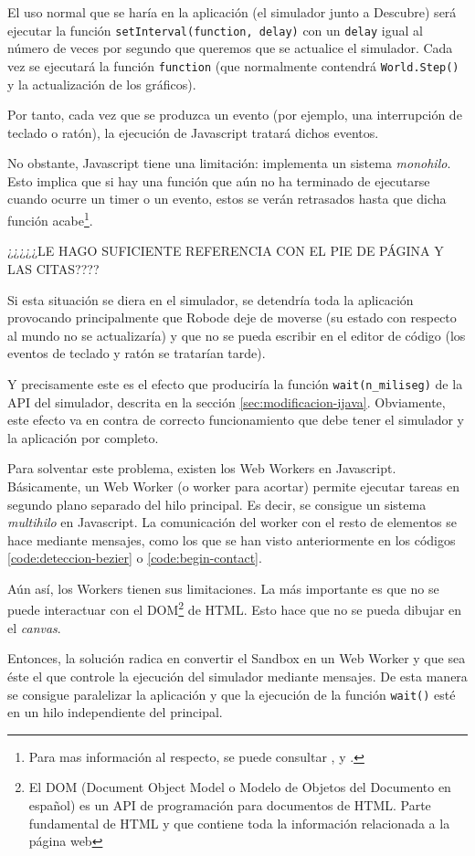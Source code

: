 El uso normal que se haría en la aplicación (el simulador junto a Descubre) será ejecutar la función \texttt{setInterval(function, delay)} con un \texttt{delay} igual al número de veces por segundo que queremos que se actualice el simulador. Cada vez se ejecutará la función \texttt{function} (que normalmente contendrá \texttt{World.Step()} y la actualización de los gráficos).

Por tanto, cada vez que se produzca un evento (por ejemplo, una interrupción de teclado o ratón), la ejecución de Javascript tratará dichos eventos. 

No obstante, Javascript tiene una limitación: implementa un sistema \emph{monohilo}. Esto implica que si hay una función que aún no ha terminado de ejecutarse cuando ocurre un timer o un evento, estos se verán retrasados hasta que dicha función acabe\footnote{Para mas información al respecto, se puede consultar \cite{js-timers-works}, \cite{event-loop-js} y \cite{resig2013secrets}.}.

{\color{red} ¿¿¿¿¿LE HAGO SUFICIENTE REFERENCIA CON EL PIE DE PÁGINA Y LAS CITAS????}

Si esta situación se diera en el simulador, se detendría toda la aplicación provocando principalmente que Robode deje de moverse (su estado con respecto al mundo no se actualizaría) y que no se pueda escribir en el editor de código (los eventos de teclado y ratón se tratarían tarde).

Y precisamente este es el efecto que produciría la función \texttt{wait(n\_miliseg)} de la API del simulador, descrita en la sección \ref{sec:modificacion-ijava}. Obviamente, este efecto va en contra de correcto funcionamiento que debe tener el simulador y la aplicación por completo.

Para solventar este problema, existen los Web Workers\cite{web-worker-mdn} en Javascript. Básicamente, un Web Worker (o worker para acortar) permite ejecutar tareas en segundo plano separado del hilo principal. Es decir, se consigue un sistema \emph{multihilo} en Javascript. La comunicación del worker con el resto de elementos se hace mediante mensajes, como los que se han visto anteriormente en los códigos \ref{code:deteccion-bezier} o \ref{code:begin-contact}.

{\color{red}
Aún así, los Workers tienen sus limitaciones. La más importante es que no se puede interactuar con el DOM\footnote{El DOM (Document Object Model o Modelo de Objetos del Documento en español) es un API de programación para documentos de HTML. Parte fundamental de HTML y que contiene toda la información relacionada a la página web} de HTML. Esto hace que no se pueda dibujar en el \emph{canvas}. 

Entonces, la solución radica en convertir el Sandbox en un Web Worker y que sea éste el que controle la ejecución del simulador mediante mensajes. De esta manera se consigue paralelizar la aplicación y que la ejecución de la función \texttt{wait()} esté en un hilo independiente del principal. 
}

